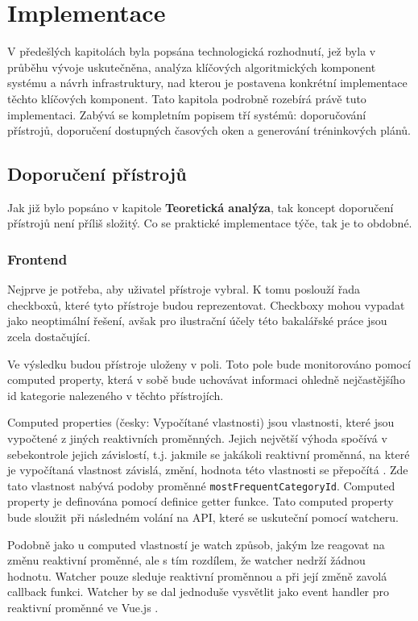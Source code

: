 \chapter{Implementace}
V předešlých kapitolách byla popsána technologická rozhodnutí, jež byla v průběhu vývoje uskutečněna, analýza klíčových algoritmických komponent systému a návrh infrastruktury, nad kterou je postavena konkrétní implementace těchto klíčových komponent. Tato kapitola podrobně rozebírá právě tuto implementaci. Zabývá se kompletním popisem tří systémů: doporučování přístrojů, doporučení dostupných časových oken a generování tréninkových plánů.

\section{Doporučení přístrojů}
Jak již bylo popsáno v kapitole \textbf{Teoretická analýza}, tak koncept doporučení přístrojů není příliš složitý. Co se praktické implementace týče, tak je to obdobné.

\subsection{Frontend}
Nejprve je potřeba, aby uživatel přístroje vybral. K tomu poslouží řada checkboxů, které tyto přístroje budou reprezentovat. Checkboxy mohou vypadat jako neoptimální řešení, avšak pro ilustrační účely této bakalářské práce jsou zcela dostačující.

Ve výsledku budou přístroje uloženy v poli. Toto pole bude monitorováno pomocí computed property, která v sobě bude uchovávat informaci ohledně nejčastějšího id kategorie nalezeného v těchto přístrojích.

Computed properties (česky: Vypočítané vlastnosti) jsou vlastnosti, které jsou vypočtené z jiných reaktivních proměnných. Jejich největší výhoda spočívá v sebekontrole jejich závislostí, t.j. jakmile se jakákoli reaktivní proměnná, na které je vypočítaná vlastnost závislá, změní, hodnota této vlastnosti se přepočítá \cite{vuejsVuejsComputed}. Zde tato vlastnost nabývá podoby proměnné \texttt{mostFrequentCategoryId}. Computed property je definována pomocí definice getter funkce. Tato computed property bude sloužit při následném volání na API, které se uskuteční pomocí watcheru.

Podobně jako u computed vlastností je watch způsob, jakým lze reagovat na změnu reaktivní proměnné, ale s tím rozdílem, že watcher nedrží žádnou hodnotu. Watcher pouze sleduje reaktivní proměnnou a při její změně zavolá callback funkci. Watcher by se dal jednoduše vysvětlit jako event handler pro reaktivní proměnné ve Vue.js \cite{vuejsVuejsWatchers}.


